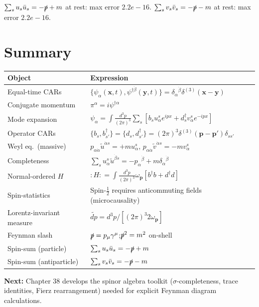 \documentclass[12pt]{article}
\newcommand{\verified}[1]{\textcolor{verifygreen}{\checkmark\; #1}}
\newcommand{\omegap}{\omega_{\mathbf{p}}}
\begin{document}
\verified{$\sum_s u_s\bar u_s = -\slashed{p}+m$ at rest: max error $2.2e-16$.}
\verified{$\sum_s v_s\bar v_s = -\slashed{p}-m$ at rest: max error $2.2e-16$.}

\section{Summary}

\begin{center}
\renewcommand{\arraystretch}{1.5}
\begin{tabular}{@{}ll@{}}
  \toprule
  Object & Expression \\
  \midrule
  Equal-time CARs & $\{\psi_\alpha(\mathbf{x},t),\psi^{\dagger\dot\beta}(\mathbf{y},t)\}
    = \delta_\alpha{}^{\dot\beta}\delta^{(3)}(\mathbf{x}-\mathbf{y})$ \\
  Conjugate momentum & $\pi^\alpha = i\psi^{\dagger\alpha}$ \\
  Mode expansion & $\psi_\alpha = \int\frac{d^3p}{(2\pi)^3}\sum_s
    [b_s u^s_\alpha e^{ipx} + d^\dagger_s v^s_\alpha e^{-ipx}]$ \\
  Operator CARs & $\{b_s,b^\dagger_{s'}\} = \{d_s,d^\dagger_{s'}\}
    = (2\pi)^3\delta^{(3)}(\mathbf{p}-\mathbf{p}')\delta_{ss'}$ \\
  Weyl eq.\ (massive) & $p_{\alpha\dot\alpha}\tilde u^{\dot\alpha s} = +m u^s_\alpha$,\quad
    $p_{\alpha\dot\alpha}\tilde v^{\dot\alpha s} = -m v^s_\alpha$ \\
  Completeness & $\sum_s u^s_\alpha\tilde u^{\dot\beta s} = -p_\alpha{}^{\dot\beta} + m\delta_\alpha{}^{\dot\beta}$ \\
  Normal-ordered $H$ & $:H: = \int\frac{d^3p}{(2\pi)^3}\omegap[b^\dagger b + d^\dagger d]$ \\
  Spin-statistics & Spin-$\frac{1}{2}$ requires anticommuting fields (microcausality) \\
  Lorentz-invariant measure & $\widetilde{dp} = d^3p/[(2\pi)^3 2\omega_{\mathbf{p}}]$ \\
  Feynman slash & $\slashed{p}=p_\mu\gamma^\mu$;\quad $\slashed{p}^2=m^2$ on-shell \\
  Spin-sum (particle) & $\sum_s u_s\bar u_s = -\slashed{p}+m$ \\
  Spin-sum (antiparticle) & $\sum_s v_s\bar v_s = -\slashed{p}-m$ \\
  \bottomrule
\end{tabular}
\end{center}

\bigskip
\noindent\textbf{Next:} Chapter 38 develops the spinor algebra toolkit
($\sigma$-completeness, trace identities, Fierz rearrangement) needed for
explicit Feynman diagram calculations.
\end{document}
